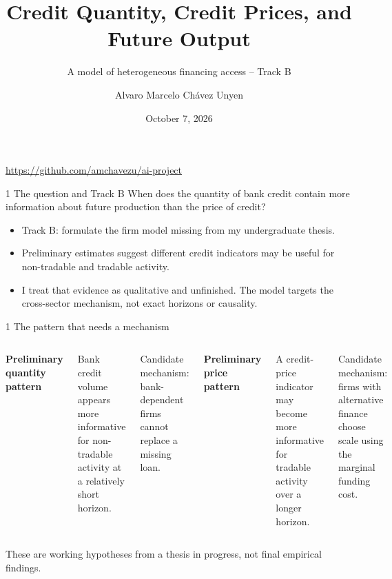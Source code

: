 \documentclass[aspectratio=169,11pt]{beamer}
\title{Credit Quantity, Credit Prices, and Future Output}
\subtitle{A model of heterogeneous financing access -- Track B}
\author{Alvaro Marcelo Ch\'avez Unyen}
\date{October 7, 2026}
\begin{document}
\begin{frame}[plain]
  \titlepage
  \begin{center}\small
    \url{https://github.com/amchavezu/ai-project}
  \end{center}
\end{frame}

\begin{frame}{1 \textperiodcentered{} The question and Track B}
\large
When does the \alert{quantity} of bank credit contain more information about
future production than the \alert{price} of credit?

\medskip
\normalsize
\begin{itemize}
  \item Track B: formulate the firm model missing from my undergraduate thesis.
  \item Preliminary estimates suggest different credit indicators may be useful
        for non-tradable and tradable activity.
  \item I treat that evidence as qualitative and unfinished. The model targets
        the cross-sector mechanism, not exact horizons or causality.
\end{itemize}
\end{frame}

\begin{frame}{1 \textperiodcentered{} The pattern that needs a mechanism}
\begin{columns}[T,onlytextwidth]
  \textbf{Preliminary quantity pattern}

  Bank credit volume appears more informative for non-tradable activity at a
  relatively short horizon.

  \medskip
  Candidate mechanism: bank-dependent firms cannot replace a missing loan.

  \textbf{Preliminary price pattern}

  A credit-price indicator may become more informative for tradable activity
  over a longer horizon.

  \medskip
  Candidate mechanism: firms with alternative finance choose scale using the
  marginal funding cost.
\end{columns}

\vfill
\footnotesize These are working hypotheses from a thesis in progress, not
final empirical findings.
\end{frame}
\end{document}
